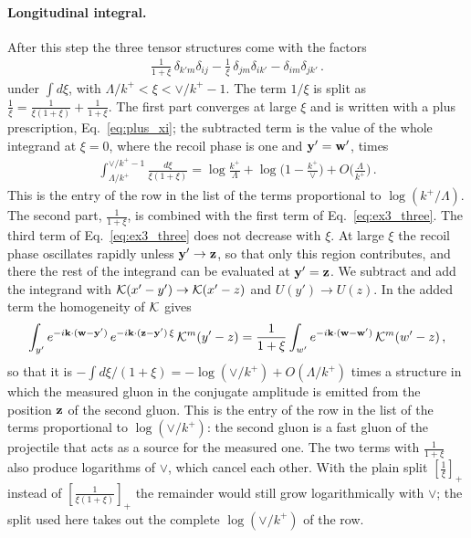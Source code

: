\paragraph{Longitudinal integral.} After this step the three tensor structures come with the factors
\begin{align}\label{eq:ex3_three}
\frac{1}{1+\xi}\,\delta_{k'm}\delta_{ij}-\frac1\xi\,\delta_{jm}\delta_{ik'}-\delta_{im}\delta_{jk'}\,.
\end{align}
under $\int d\xi$, with $\Lambda/k^+<\xi<\vee/k^+-1$. The term $1/\xi$ is split as $\frac1\xi=\frac{1}{\xi(1+\xi)}+\frac{1}{1+\xi}$. The first part converges at large $\xi$ and is written with a plus prescription, Eq.~\eqref{eq:plus_xi}; the subtracted term is the value of the whole integrand at $\xi=0$, where the recoil phase is one and $\mathbf{y}'=\mathbf{w}'$, times
\begin{align}
\int_{\Lambda/k^+}^{\vee/k^+-1}\frac{d\xi}{\xi(1+\xi)}=\log\frac{k^+}{\Lambda}+\log\Big(1-\frac{k^+}{\vee}\Big)+O\Big(\frac{\Lambda}{k^+}\Big)\,.
\end{align}
This is the entry of the row in the list of the terms proportional to $\log(k^+/\Lambda)$. The second part, $\frac{1}{1+\xi}$, is combined with the first term of Eq.~\eqref{eq:ex3_three}. The third term of Eq.~\eqref{eq:ex3_three} does not decrease with $\xi$. At large $\xi$ the recoil phase oscillates rapidly unless $\mathbf{y}'\to\mathbf{z}$, so that only this region contributes, and there the rest of the integrand can be evaluated at $\mathbf{y}'=\mathbf{z}$. We subtract and add the integrand with $\mathcal{K}(x'-y')\to\mathcal{K}(x'-z)$ and $U(y')\to U(z)$. In the added term the homogeneity of $\mathcal{K}$ gives
\begin{align}\label{eq:ex3_FT}
\int_{y'}e^{-i\mathbf{k}\cdot(\mathbf{w}-\mathbf{y}')}\,e^{-i\mathbf{k}\cdot(\mathbf{z}-\mathbf{y}')\,\xi}\,\mathcal{K}^m(y'-z)=\frac{1}{1+\xi}\int_{w'}e^{-i\mathbf{k}\cdot(\mathbf{w}-\mathbf{w}')}\,\mathcal{K}^m(w'-z)\,,
\end{align}
so that it is $-\int d\xi/(1+\xi)=-\log(\vee/k^+)+O(\Lambda/k^+)$ times a structure in which the measured gluon in the conjugate amplitude is emitted from the position $\mathbf{z}$ of the second gluon. This is the entry of the row in the list of the terms proportional to $\log(\vee/k^+)$: the second gluon is a fast gluon of the projectile that acts as a source for the measured one. The two terms with $\frac{1}{1+\xi}$ also produce logarithms of $\vee$, which cancel each other. With the plain split $[\frac1\xi]_+$ instead of $[\frac{1}{\xi(1+\xi)}]_+$ the remainder would still grow logarithmically with $\vee$; the split used here takes out the complete $\log(\vee/k^+)$ of the row.

